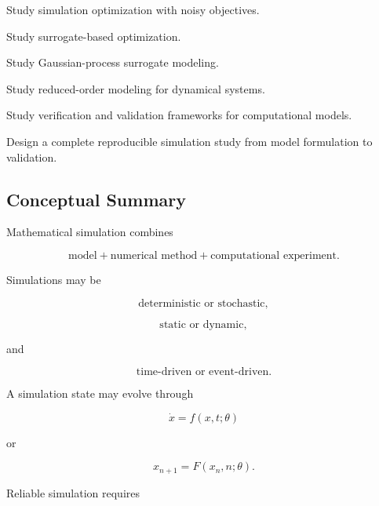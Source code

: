 \begin{exercise}[4]
Study simulation optimization with noisy objectives.
\end{exercise}

\begin{exercise}[4]
Study surrogate-based optimization.
\end{exercise}

\begin{exercise}[4]
Study Gaussian-process surrogate modeling.
\end{exercise}

\begin{exercise}[4]
Study reduced-order modeling for dynamical systems.
\end{exercise}

\begin{exercise}[4]
Study verification and validation frameworks for computational models.
\end{exercise}

\begin{exercise}[4]
Design a complete reproducible simulation study from model formulation to
validation.
\end{exercise}

\subsection{Conceptual Summary}
\label{subsec:mathematical-simulation-summary}

Mathematical simulation combines

\[
\boxed{
\text{model}
+
\text{numerical method}
+
\text{computational experiment}.
}
\]

Simulations may be

\[
\boxed{
\text{deterministic or stochastic},
}
\]

\[
\boxed{
\text{static or dynamic},
}
\]

and

\[
\boxed{
\text{time-driven or event-driven}.
}
\]

A simulation state may evolve through

\[
\boxed{
\dot{x}
=
f(x,t;\theta)
}
\]

or

\[
\boxed{
x_{n+1}
=
F(x_n,n;\theta).
}
\]

Reliable simulation requires

